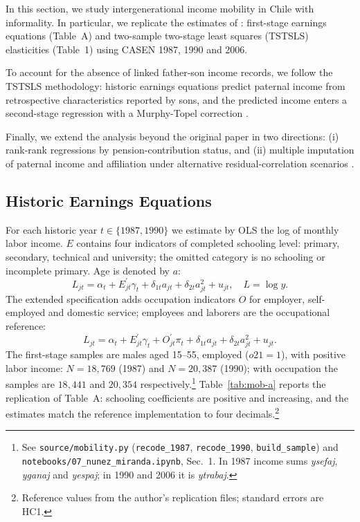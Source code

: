 In this section, we study intergenerational income mobility in Chile with informality. In particular, we replicate the estimates of \citet{nunez2010mobility}: first-stage earnings equations (Table~A) and two-sample two-stage least squares (TSTSLS) elasticities (Table~1) using CASEN 1987, 1990 and 2006.

To account for the absence of linked father-son income records, we follow the TSTSLS methodology: historic earnings equations predict paternal income from retrospective characteristics reported by sons, and the predicted income enters a second-stage regression with a Murphy-Topel correction \citep{murphy1985estimation}.

Finally, we extend the analysis beyond the original paper in two directions: (i) rank-rank regressions by pension-contribution status, and (ii) multiple imputation of paternal income and affiliation under alternative residual-correlation scenarios \citep{vanbuuren2018flexible,kim2016statistical}.

\subsection{Historic Earnings Equations}\label{sec:first-stage}
For each historic year $t \in \{1987, 1990\}$ we estimate by OLS the log of monthly labor income. $E$ contains four indicators of completed schooling level: primary, secondary, technical and university; the omitted category is no schooling or incomplete primary. Age is denoted by $a$:
\begin{equation}
    L_{jt} = \alpha_t + E_{jt}^{\prime}\gamma_t + \delta_{1t}a_{jt} + \delta_{2t}a_{jt}^2 + u_{jt}, \quad L = \log y.
    \label{eq:earn-a}
\end{equation}
The extended specification adds occupation indicators $O$ for employer, self-employed and domestic service; employees and laborers are the occupational reference:
\begin{equation}
    L_{jt} = \alpha_t + E_{jt}^{\prime}\gamma_t + O_{jt}^{\prime}\pi_t + \delta_{1t}a_{jt} + \delta_{2t}a_{jt}^2 + u_{jt}.
    \label{eq:earn-b}
\end{equation}
The first-stage samples are males aged 15--55, employed ($o21=1$), with positive labor income: $N=18{,}769$ (1987) and $N=20{,}387$ (1990); with occupation the samples are $18{,}441$ and $20{,}354$ respectively.\footnote{See \texttt{source/mobility.py} (\texttt{recode\_1987}, \texttt{recode\_1990}, \texttt{build\_sample}) and \texttt{notebooks/07\_nunez\_miranda.ipynb}, Sec.~1. In 1987 income sums \textit{ysefaj}, \textit{yganaj} and \textit{yespaj}; in 1990 and 2006 it is \textit{ytrabaj}.} Table~\ref{tab:mob-a} reports the replication of Table~A: schooling coefficients are positive and increasing, and the estimates match the reference implementation to four decimals.\footnote{Reference values from the author's replication files; standard errors are HC1.}

